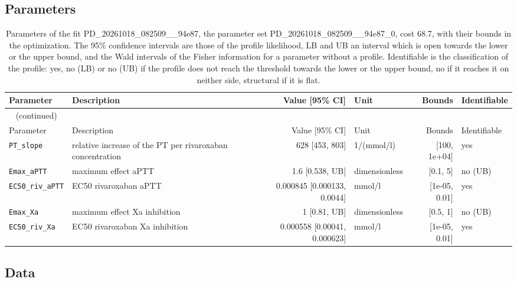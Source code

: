 \subsection{Parameters}

\begin{longtable}{llrlrl}
\caption{Parameters of the fit PD\_20261018\_082509\_\_94e87, the parameter set PD\_20261018\_082509\_\_94e87\_0, cost 68.7, with their bounds in the optimization. The 95\% confidence intervals are those of the profile likelihood, LB and UB an interval which is open towards the lower or the upper bound, and the Wald intervals of the Fisher information for a parameter without a profile. Identifiable is the classification of the profile: yes, no (LB) or no (UB) if the profile does not reach the threshold towards the lower or the upper bound, no if it reaches it on neither side, structural if it is flat.}\label{tab:parameters:PD_20261018_082509__94e87} \\
\toprule
Parameter & Description & Value [95\% CI] & Unit & Bounds & Identifiable \\
\midrule
\endfirsthead
\multicolumn{6}{l}{\small\tablename~\thetable{} (continued)} \\
\toprule
Parameter & Description & Value [95\% CI] & Unit & Bounds & Identifiable \\
\midrule
\endhead
\bottomrule
\endlastfoot
\texttt{PT\_slope} & relative increase of the PT per rivaroxaban concentration & 628 [453, 803] & 1/(mmol/l) & [100, 1e+04] & yes \\
\texttt{Emax\_aPTT} & maximum effect aPTT & 1.6 [0.538, UB] & dimensionless & [0.1, 5] & no (UB) \\
\texttt{EC50\_riv\_aPTT} & EC50 rivaroxaban aPTT & 0.000845 [0.000133, 0.0044] & mmol/l & [1e-05, 0.01] & yes \\
\texttt{Emax\_Xa} & maximum effect Xa inhibition & 1 [0.81, UB] & dimensionless & [0.5, 1] & no (UB) \\
\texttt{EC50\_riv\_Xa} & EC50 rivaroxaban Xa inhibition & 0.000558 [0.00041, 0.000623] & mmol/l & [1e-05, 0.01] & yes \\
\end{longtable}

\subsection{Data}

